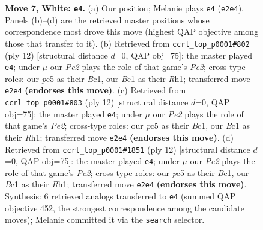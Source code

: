 \documentclass[11pt]{article}
\begin{document}
\begin{figure}[p]
\caption{\textbf{Move 7, White: \texttt{e4}.} (a) Our position; Melanie plays \texttt{e4} (\texttt{e2e4}). Panels (b)--(d) are the retrieved master positions whose correspondence most drove this move (highest QAP objective among those that transfer to it). (b) Retrieved from \texttt{ccrl\_top\_p0001\#802} (ply 12) [structural distance $d$=0, QAP obj=75]: the master played \texttt{e4}; under $\mu$ our \emph{Pe2} plays the role of that game's \emph{Pe2}; cross-type roles: our \emph{p}c5 as their \emph{B}c1, our \emph{B}c1 as their \emph{R}h1; transferred move \texttt{e2e4} \textbf{(endorses this move)}. (c) Retrieved from \texttt{ccrl\_top\_p0001\#803} (ply 12) [structural distance $d$=0, QAP obj=75]: the master played \texttt{e4}; under $\mu$ our \emph{Pe2} plays the role of that game's \emph{Pe2}; cross-type roles: our \emph{p}c5 as their \emph{B}c1, our \emph{B}c1 as their \emph{R}h1; transferred move \texttt{e2e4} \textbf{(endorses this move)}. (d) Retrieved from \texttt{ccrl\_top\_p0001\#1851} (ply 12) [structural distance $d$=0, QAP obj=75]: the master played \texttt{e4}; under $\mu$ our \emph{Pe2} plays the role of that game's \emph{Pe2}; cross-type roles: our \emph{p}c5 as their \emph{B}c1, our \emph{B}c1 as their \emph{R}h1; transferred move \texttt{e2e4} \textbf{(endorses this move)}. Synthesis: 6 retrieved analogs transferred to \texttt{e4} (summed QAP objective 452, the strongest correspondence among the candidate moves); Melanie committed it via the \texttt{search} selector.}
\label{fig:thought-m12}
\end{figure}

\clearpage
\end{document}
